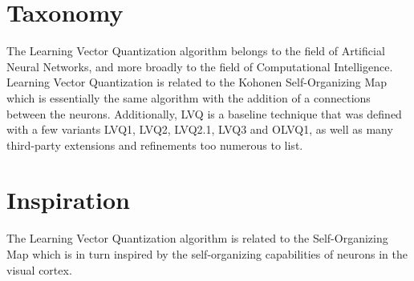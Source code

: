 \documentclass[a4paper, 11pt]{article}
\begin{document}
\section{Taxonomy}
\label{sec:taxonomy}
The Learning Vector Quantization algorithm belongs to the field of Artificial Neural Networks, and more broadly to the field of Computational Intelligence. 
Learning Vector Quantization is related to the Kohonen Self-Organizing Map which is essentially the same algorithm with the addition of a connections between the neurons. Additionally, LVQ is a baseline technique that was defined with a few variants LVQ1, LVQ2, LVQ2.1, LVQ3 and OLVQ1, as well as many third-party extensions and refinements too numerous to list.

\section{Inspiration}
\label{sec:inspiration}
The Learning Vector Quantization algorithm is related to the Self-Organizing Map which is in turn inspired by the self-organizing capabilities of neurons in the visual cortex. 
\end{document}
